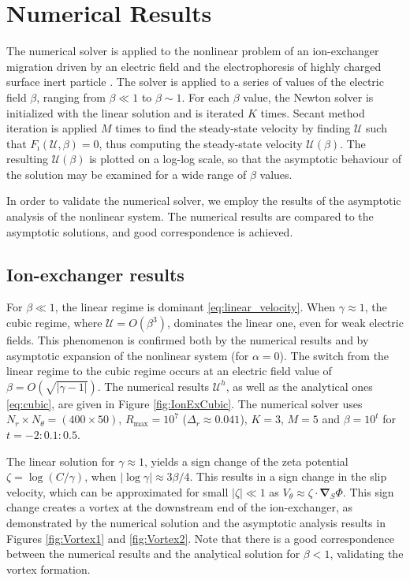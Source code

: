 \documentclass[MSc,beforeExam]{iitcsthesis}
\newcommand\bnabla{\boldsymbol{\nabla}}
\newcommand\cU{\mathscr{U}}
\begin{document}
\section{Numerical Results} \label{sec:results}
The numerical solver is applied to the nonlinear problem of an ion-exchanger migration 
driven by an electric field \cite{yariv2010migration}
and the electrophoresis of highly charged surface inert particle 
\cite{schnitzer2012surface}. 
The solver is applied to a series of values of the electric field $\beta$, ranging 
from $\beta \ll 1$ to $\beta \sim 1$.
For each $\beta$ value, the Newton solver is initialized with the linear solution and is iterated $K$ times.
Secant method iteration is applied $M$ times to find the steady-state velocity 
by finding $\cU$ such that $F_\imath(\cU, \beta) = 0$, thus computing 
the steady-state velocity $\cU(\beta)$. 
The resulting $\cU(\beta)$ is plotted on a log-log scale, so that the asymptotic behaviour
of the solution may be examined for a wide range of $\beta$ values.
 
In order to validate the numerical solver, we employ 
the results of the asymptotic analysis of the nonlinear 
system. 
The numerical results are compared 
to the asymptotic solutions, and good correspondence is achieved.

\subsection{Ion-exchanger results}
For $\beta \ll 1$, the linear regime is dominant \eqref{eq:linear_velocity}.
When $\gamma \approx 1$, the cubic regime, where $\cU = O(\beta^3)$, 
dominates the linear one, even for weak electric fields. 
This phenomenon is confirmed both by the numerical
results and by asymptotic expansion of the nonlinear system (for $\alpha=0$).
The switch from the linear regime to the cubic regime occurs at 
an electric field value of $\beta = O(\sqrt{|\gamma - 1|})$.
The numerical results $\cU^h$, 
as well as the analytical ones \eqref{eq:cubic}, are given in Figure \ref{fig:IonExCubic}.
The numerical solver uses $N_r \times N_\theta = (400 \times 50)$, 
$R_{\max} = 10^7$ ($\Delta_r \approx 0.041$),
$K = 3$, $M = 5$ and $\beta = 10^{t}$ for $t = -2:0.1:0.5$.


The linear solution for $\gamma \approx 1$, 
yields a sign change of the zeta potential $\zeta = \log (C/\gamma)$, when
$|\log\gamma| \approx 3\beta / 4$. This results in a sign change in the slip velocity,
which can be approximated for small $|\zeta| \ll 1$ as $V_\theta \approx \zeta \cdot \bnabla_S \varPhi$.
This sign change creates a vortex at the downstream end of the ion-exchanger, 
as demonstrated by the numerical solution and the asymptotic analysis results 
in Figures \ref{fig:Vortex1} and \ref{fig:Vortex2}.
Note that there is a good correspondence between the numerical
results and the analytical solution for $\beta < 1$, validating
the vortex formation.
\end{document}
